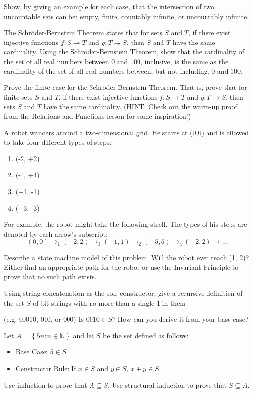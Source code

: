 \documentclass[solution, letterpaper]{cs20}
\begin{document}

Show, by giving an example for each case, that the intersection of two uncountable sets can be: empty, finite, countably
infinite, or uncountably infinite.

\subproblem The Schr\"{o}der-Bernstein Theorem states that for sets $S$ and $T$, if there exist injective functions $f : S \rightarrow T$ and $g : T \rightarrow S$, then $S$ and $T$ have the same cardinality. Using the Schr\"{o}der-Bernstein Theorem, show that the cardinality of the set of all real numbers between $0$ and $100$, inclusive, is the same as the cardinality of the set of all real numbers between, but not including, $0$ and $100$.

\subproblem Prove the finite case for the Schr\"{o}der-Bernstein Theorem. That is, prove that for finite sets $S$ and $T$, if there exist injective functions $f : S \rightarrow T$ and $g : T \rightarrow S$, then sets $S$ and $T$ have the same cardinality. (HINT: Check out the warm-up proof from the Relations and Functions lesson for some inspiration!)

A robot wanders around a two-dimensional grid. He starts at (0,0) and is allowed to take four different types of steps:
\begin{enumerate}
\item (-2, +2)
\item (-4, +4)
\item (+1, -1)
\item (+3, -3)
\end{enumerate}
For example, the robot might take the following stroll. The types of his steps are denoted by each arrow's subscript:
$$(0,0) \to_1 (-2,2) \to_3 (-1,1) \to_2 (-5,5) \to_4 (-2,2) \to \ldots$$

\subproblem Describe a state machine model of this problem.
\subproblem Will the robot ever reach (1, 2)? Either find an appropriate path for the robot or use the Invariant Principle to prove that no such path exists.

\subproblem Using string concatenation as the sole constructor, give a recursive definition of the set $S$ of bit strings with no more than a single 1 in them 

(e.g. 00010, 010, or 000)
\subproblem Is $0010\in S$? How can you derive it from your base case?

Let $A = \left\{ {5n:n\in\mathbb{N}}\right\}$ and let $S$ be the set defined as follows:
\begin{itemize}
\item Base Case: $5 \in S$
\item Constructor Rule: If $x\in S$ and $y\in S$, $x+y \in S$ 
\end{itemize}
\subproblem Use induction to prove that $A\subseteq S $.
\subproblem Use structural induction to prove that $S\subseteq A$.
\end{document}
